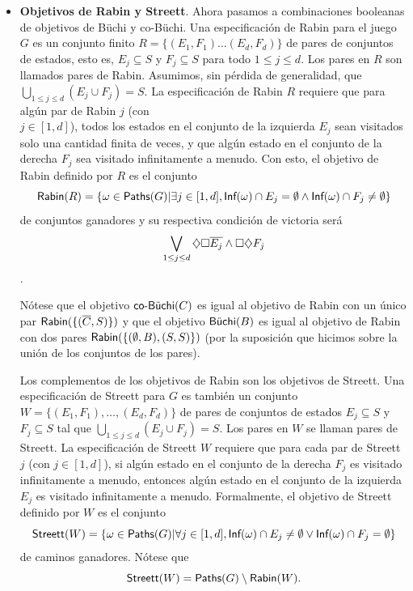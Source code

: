 \begin{itemize}
	\item \textbf{Objetivos de Rabin y Streett}. Ahora pasamos a combinaciones booleanas de objetivos de Büchi y co-Büchi. Una especificación de Rabin para el juego $G$ es un conjunto finito $R = \{(E_1,F_1) \dots (E_d, F_d)\}$ de pares de conjuntos de estados, esto es, $E_j \subseteq S$ y $F_j \subseteq S$ para todo $ 1 \leq j \leq d$. Los pares en $R$ son llamados pares de Rabin. Asumimos, sin pérdida de generalidad, que $\bigcup_{1 \leq j \leq d} (E_j \cup F_j) = S$. La especificación de Rabin $R$ requiere que para algún par de Rabin $j$ (con \\ $j \in [1,d]$), todos los estados en el conjunto de la izquierda $E_j$ sean visitados solo una cantidad finita de veces, y que algún estado en el conjunto de la derecha $F_j$ sea visitado infinitamente a menudo. Con esto, el objetivo de Rabin definido por $R$ es el conjunto $$\Rabin(R) = \{\omega \in \Paths(G) | \exists j \in [1, d], \Inf(\omega) \cap E_j = \emptyset \wedge \Inf(\omega) \cap F_j \neq \emptyset \}$$ de conjuntos ganadores y su respectiva condición de victoria será $$\bigvee_{1 \leq j \leq d} \eventsiemp \overline{E_j} \wedge \siempevent F_j$$.

	      Nótese que el objetivo $\coBuchi(C)$ es igual al objetivo de Rabin con un único
	      par $\Rabin(\{(\overline C,S)\})$ y que el objetivo $\Buchi(B)$ es igual al
	      objetivo de Rabin con dos pares $\Rabin(\{(\emptyset, B), (S,S)\})$ (por la
	      suposición que hicimos sobre la unión de los conjuntos de los pares).

	      Los complementos de los objetivos de Rabin son los objetivos de Streett. Una
	      especificación de Streett para $G$ es también un conjunto $W = \{(E_1, F_1),
		      \dots, (E_d, F_d)\}$ de pares de conjuntos de estados $E_j \subseteq S$ y $F_j
		      \subseteq S$ tal que $\bigcup_{1 \leq j \leq d} (E_j \cup F_j) = S$. Los pares
	      en $W$ se llaman pares de Streett. La especificación de Streett $W$ requiere
	      que para cada par de Streett $j$ (con $j \in [1,d]$), si algún estado en el
	      conjunto de la derecha $F_j$ es visitado infinitamente a menudo, entonces algún
	      estado en el conjunto de la izquierda $E_j$ es visitado infinitamente a menudo.
	      Formalmente, el objetivo de Streett definido por $W$ es el conjunto
	      $$\Streett(W) = \{\omega \in \Paths(G) | \forall j \in [1,d], \Inf(\omega) \cap
		      E_j \neq \emptyset \vee \Inf(\omega) \cap F_j = \emptyset\}$$ de caminos
	      ganadores. Nótese que $$\Streett(W) = \Paths(G) \setminus \Rabin(W).$$


\end{itemize}
